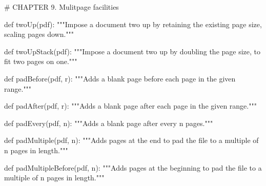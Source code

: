 # CHAPTER 9. Mulitpage facilities

def twoUp(pdf):
    """Impose a document two up by retaining the existing page
    size, scaling pages down."""

def twoUpStack(pdf):
    """Impose a document two up by doubling the page size,
    to fit two pages on one."""

def padBefore(pdf, r):
    """Adds a blank page before each page in the given range."""

def padAfter(pdf, r):
    """Adds a blank page after each page in the given range."""

def padEvery(pdf, n):
    """Adds a blank page after every n pages."""

def padMultiple(pdf, n):
    """Adds pages at the end to pad the file to a multiple of n pages in
    length."""

def padMultipleBefore(pdf, n):
    """Adds pages at the beginning to pad the file to a
    multiple of n pages in length."""
